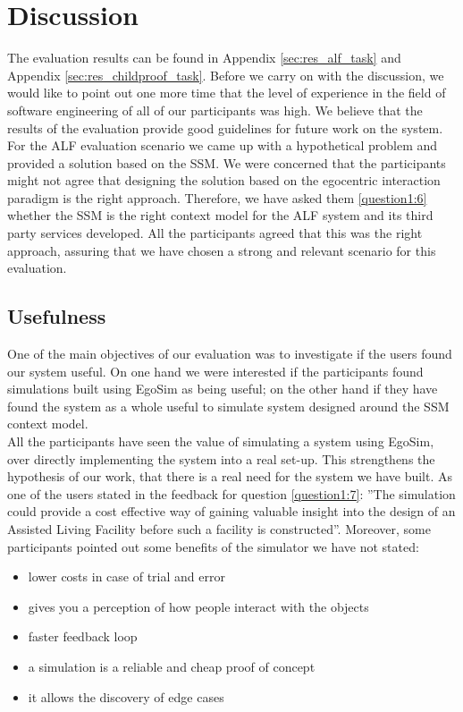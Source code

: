 \section{Discussion} %
\label{sec:eval_discussion}
The evaluation results can be found in Appendix \ref{sec:res_alf_task} and Appendix \ref{sec:res_childproof_task}. Before we carry on with the discussion, we would like to point out one more time that the level of experience in the field of software engineering of all of our participants was high. We believe that the results of the evaluation provide good guidelines for future work on the system.\\

For the ALF evaluation scenario we came up with a hypothetical problem and provided a solution based on the SSM. We were concerned that the participants might not agree that designing the solution based on the egocentric interaction paradigm is the right approach. Therefore, we have asked them \ref{question1:6} whether the SSM is the right context model for the ALF system and its third party services developed. All the participants agreed that this was the right approach, assuring that we have chosen a strong and relevant scenario for this evaluation.\\

\subsection{Usefulness} %
\label{sec:eval_usefulness}
One of the main objectives of our evaluation was to investigate if the users found our system useful. On one hand we were interested if the participants found simulations built using EgoSim as being useful; on the other hand if they have found the system as a whole useful to simulate system designed around the SSM context model.\\

All the participants have seen the value of simulating a system using EgoSim, over directly implementing the system into a real set-up. This strengthens the hypothesis of our work, that there is a real need for the system we have built. As one of the users stated in the feedback for question \ref{question1:7}: ''The simulation could provide a cost effective way of gaining valuable insight into the design of an Assisted Living Facility before such a facility is constructed''. Moreover, some participants pointed out some benefits of the simulator we have not stated:
\begin{itemize}
	\item lower costs in case of trial and error
	\item gives you a perception of how people interact with the objects
	\item faster feedback loop
	\item a simulation is a reliable and cheap proof of concept
	\item it allows the discovery of edge cases
\end{itemize}

